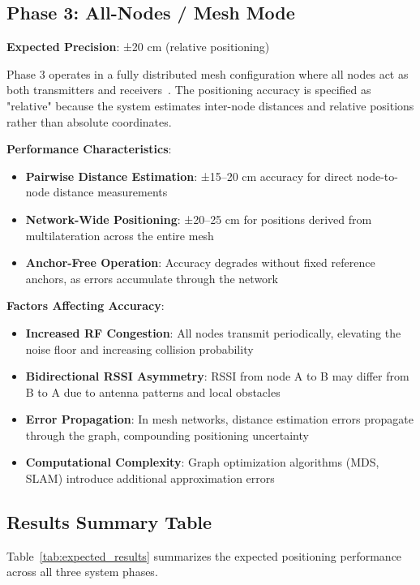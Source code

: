 \subsection{Phase 3: All-Nodes / Mesh Mode}

\textbf{Expected Precision}: ±20 cm (relative positioning)

Phase 3 operates in a fully distributed mesh configuration where all nodes act as both transmitters and receivers~\cite{akyildiz2005wireless, moore2004robust}. The positioning accuracy is specified as "relative" because the system estimates inter-node distances and relative positions rather than absolute coordinates.

\textbf{Performance Characteristics}:
\begin{itemize}
    \item \textbf{Pairwise Distance Estimation}: ±15--20 cm accuracy for direct node-to-node distance measurements
    \item \textbf{Network-Wide Positioning}: ±20--25 cm for positions derived from multilateration across the entire mesh
    \item \textbf{Anchor-Free Operation}: Accuracy degrades without fixed reference anchors, as errors accumulate through the network
\end{itemize}

\textbf{Factors Affecting Accuracy}:
\begin{itemize}
    \item \textbf{Increased RF Congestion}: All nodes transmit periodically, elevating the noise floor and increasing collision probability
    \item \textbf{Bidirectional RSSI Asymmetry}: RSSI from node A to B may differ from B to A due to antenna patterns and local obstacles
    \item \textbf{Error Propagation}: In mesh networks, distance estimation errors propagate through the graph, compounding positioning uncertainty
    \item \textbf{Computational Complexity}: Graph optimization algorithms (MDS, SLAM) introduce additional approximation errors~\cite{shang2003localization, ji2006sensor}
\end{itemize}

\subsection{Results Summary Table}

Table~\ref{tab:expected_results} summarizes the expected positioning performance across all three system phases.

